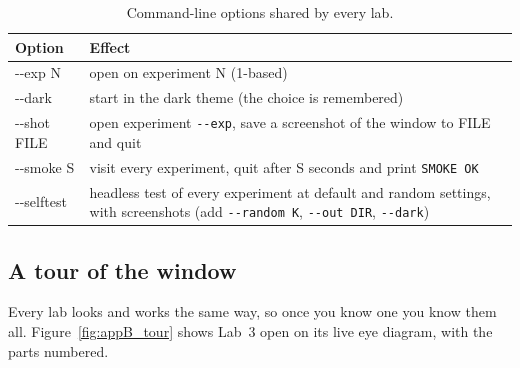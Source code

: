 \begin{table}[htbp]\centering\small
\caption{Command-line options shared by every lab.}\label{tab:appB:cli}
\begin{tabularx}{\linewidth}{@{}>{\ttfamily}l>{\raggedright\arraybackslash}X@{}}
\toprule
\normalfont Option & Effect\\
\midrule
-{}-exp N & open on experiment N (1-based)\\
-{}-dark & start in the dark theme (the choice is remembered)\\
-{}-shot FILE & open experiment \texttt{-{}-exp}, save a screenshot of the window to FILE and quit\\
-{}-smoke S & visit every experiment, quit after S seconds and print \texttt{SMOKE OK}\\
-{}-selftest & headless test of every experiment at default and random settings, with screenshots
(add \texttt{-{}-random K}, \texttt{-{}-out DIR}, \texttt{-{}-dark})\\
\bottomrule
\end{tabularx}
\end{table}

\subsection{A tour of the window}

Every lab looks and works the same way, so once you know one you know them all.
Figure~\ref{fig:appB_tour} shows Lab~3 open on its live eye diagram, with the parts numbered.


